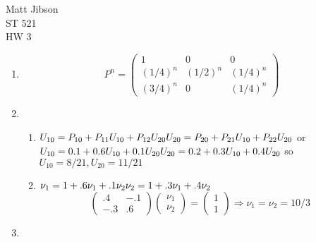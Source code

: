 \documentclass{article}
\begin{document}
\begin{flushright}
Matt Jibson \\
ST 521 \\
HW 3
\end{flushright}

\begin{enumerate}
	\item %
		\begin{displaymath}
			P^n = \left( \begin{array}{ccc} 1 & 0 & 0 \\ (1/4)^n & (1/2)^n & (1/4)^n \\ (3/4)^n & 0 & (1/4)^n \end{array} \right)
		\end{displaymath}
	\item %
		\begin{enumerate}
			\item
				$U_{10} = P_{10} + P_{11} U_{10} + P_{12} U_{20} \\
				U_{20} = P_{20} + P_{21} U_{10} + P_{22} U_{20} \\$
				or \\
				$U_{10} = 0.1 + 0.6 U_{10} + 0.1 U_{20} \\
				U_{20} = 0.2 + 0.3 U_{10} + 0.4 U_{20} \\$
				so \\
				$U_{10} = 8/21, U_{20} = 11/21$
			\item
				$\nu_1 = 1 + .6 \nu_1 + .1 \nu_2 \\
				\nu_2 = 1 + .3 \nu_1 + .4 \nu_2$ \\
				\begin{displaymath}
					\left( \begin{array}{cc} .4 & -.1 \\ -.3 & .6 \end{array} \right)
					\left( \begin{array}{c} \nu_1 \\ \nu_2 \end{array} \right) =
					\left( \begin{array}{c} 1 \\ 1 \end{array} \right) \Rightarrow
					\nu_1 = \nu_2 = 10/3
				\end{displaymath}
		\end{enumerate}
	\item %

\end{enumerate}
\end{document}
